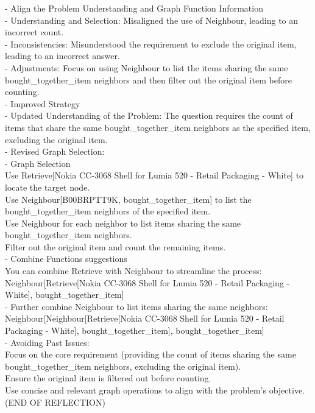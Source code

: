\documentclass[11pt]{article}
\begin{document}
\begin{tcolorbox}[colback=white!10!white, colframe=blue!30!black, title=Reflection (Amazon), boxrule=1pt, fontupper={\fontsize{7pt}{9pt}\selectfont}]
  - Align the Problem Understanding and Graph Function Information\\
    - Understanding and Selection: Misaligned the use of Neighbour, leading to an incorrect count.\\
    - Inconsistencies: Misunderstood the requirement to exclude the original item, leading to an incorrect answer.\\
    - Adjustments: Focus on using Neighbour to list the items sharing the same bought\_together\_item neighbors and then filter out the original item before counting.\\
- Improved Strategy\\
  - Updated Understanding of the Problem:
  The question requires the count of items that share the same bought\_together\_item neighbors as the specified item, excluding the original item.\\
  - Revised Graph Selection:\\
    - Graph Selection\\
    Use Retrieve[Nokia CC-3068 Shell for Lumia 520 - Retail Packaging - White] to locate the target node.\\
    Use Neighbour[B00BRPTT9K, bought\_together\_item] to list the bought\_together\_item neighbors of the specified item.\\
    Use Neighbour for each neighbor to list items sharing the same bought\_together\_item neighbors.\\
    Filter out the original item and count the remaining items.\\
    - Combine Functions suggestions\\
    You can combine Retrieve with Neighbour to streamline the process:\\
    Neighbour[Retrieve[Nokia CC-3068 Shell for Lumia 520 - Retail Packaging - White], bought\_together\_item]\\
    - Further combine Neighbour to list items sharing the same neighbors:\\
    Neighbour[Neighbour[Retrieve[Nokia CC-3068 Shell for Lumia 520 - Retail Packaging - White], bought\_together\_item], bought\_together\_item]\\
  - Avoiding Past Issues:\\
  Focus on the core requirement (providing the count of items sharing the same bought\_together\_item neighbors, excluding the original item).\\
  Ensure the original item is filtered out before counting.\\
  Use concise and relevant graph operations to align with the problem's objective. \\
  (END OF REFLECTION)
\end{tcolorbox}
\end{document}
